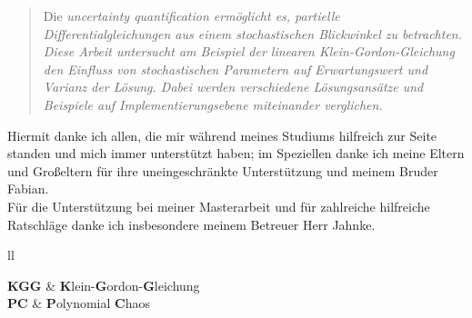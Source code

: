 \documentclass[
11pt, %
ngerman, %
singlespacing, %
headsepline, %
]{MastersDoctoralThesis} %
\begin{document}
\begin{abstract}
\addchaptertocentry{\abstractname} %
 Die \it{uncertainty quantification} ermöglicht es, partielle Differentialgleichungen aus einem stochastischen Blickwinkel zu betrachten. Diese Arbeit untersucht am Beispiel der linearen Klein-Gordon-Gleichung den Einfluss von stochastischen Parametern auf Erwartungswert und Varianz der Lösung. Dabei werden verschiedene Lösungsansätze und Beispiele auf Implementierungsebene miteinander verglichen.
\end{abstract}


\begin{acknowledgements}
\addchaptertocentry{\acknowledgementname} %
Hiermit danke ich allen, die mir während meines Studiums hilfreich zur Seite standen und mich immer unterstützt haben; im Speziellen danke ich meine Eltern und Großeltern für ihre uneingeschränkte Unterstützung und meinem Bruder Fabian.\\ 
Für die Unterstützung bei meiner Masterarbeit und für zahlreiche hilfreiche Ratschläge danke ich insbesondere meinem Betreuer Herr Jahnke. 
\end{acknowledgements}


\tableofcontents %

\listoffigures %

\listoftables %


\begin{abbreviations}{ll} %

\textbf{KGG} & \textbf{K}lein-\textbf{G}ordon-\textbf{G}leichung\\
\textbf{PC} & \textbf{P}olynomial \textbf{C}haos\\


\end{abbreviations}
\end{document}
